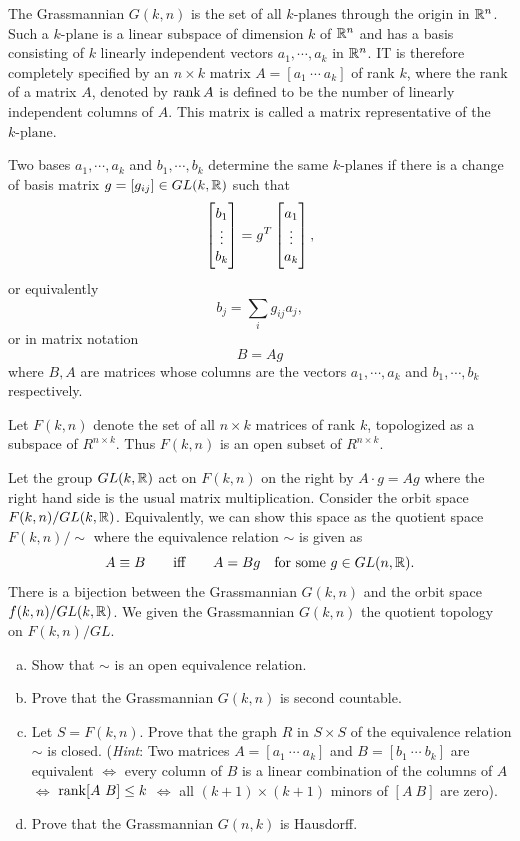 \begin{problem}
	\label{problem:Grassmannian}
	The Grassmannian $ G(k,n) $ is the set of all $ k\text{-planes} $ through the origin in $ \mathbb{R}^n $. Such a $ k\text{-plane} $ is a linear subspace of dimension $ k $ of $ \mathbb{R}^n $ and has a basis consisting of $ k $ linearly independent vectors $ a_1,\cdots,a_k $ in $ \mathbb{R}^n $. IT is therefore completely specified by an $ n\times k $ matrix $ A = [a_1\ \cdots\ a_k] $ of rank $ k $, where the rank of a matrix $ A $, denoted by $ \rank A $ is defined to be the number of linearly independent columns of $ A $. This matrix is called a matrix representative of the $ k\text{-plane} $.
	
	Two bases $ a_1,\cdots,a_k $ and $ b_1,\cdots,b_k $ determine the same $ k\text{-planes} $ if there is a change of basis matrix $ g = [g_{ij}] \in GL(k,\mathbb{R}) $ such that 
	\[ \begin{bmatrix} b_1 \\ \vdots \\ b_k \end{bmatrix} = g^T \begin{bmatrix} a_1 \\ \vdots \\ a_k \end{bmatrix}, \]
	or equivalently
	\[ b_j = \sum_{i}g_{ij}a_j, \]
	or in matrix notation
	\[ B = Ag \]
	where $ B,A $ are matrices whose columns are the vectors $ a_1,\cdots,a_k $ and $ b_1,\cdots,b_k $ respectively.
	
	Let $ F(k,n) $ denote the set of all $ n\times k $ matrices of rank $ k $, topologized as a subspace of $ R^{n\times k} $. Thus $ F(k,n) $ is an open subset of $ R^{n\times k} $.
	
	Let the group $ GL(k,\mathbb{R}) $ act on $ F(k,n) $ on the right by $ A\cdot g = Ag $ where the right hand side is the usual matrix multiplication. Consider the orbit space $ F(k,n)/GL(k,\mathbb{R}) $. Equivalently, we can show this space as the quotient space $ F(k,n)/\sim $ where the equivalence relation $ \sim $ is given as
	\[ A \equiv B \qquad \text{iff} \qquad A = Bg \quad \text{for some $ g \in GL(n,\mathbb{R}) $}. \]
	There is a bijection between the Grassmannian $ G(k,n) $  and the orbit space $ f(k,n)/GL(k,\mathbb{R}) $. We given the Grassmannian $ G(k,n) $ the quotient topology on $ F(k,n)/GL $.
	\begin{enumerate}[(a)]
		\item Show that $ \sim $ is an open equivalence relation.
		\item Prove that the Grassmannian $ G(k,n) $ is second countable.
		\item Let $ S = F(k,n) $. Prove that the graph $ R $ in $ S\times S $ of the equivalence relation $ \sim $ is closed. (\emph{Hint}: Two matrices $ A = [a_1\ \cdots\ a_k]$ and $ B = [b_1\ \cdots\ b_k] $ are equivalent $ \Leftrightarrow $ every column of $ B $ is a linear combination of the columns of $ A $ $ \Leftrightarrow $ $ \rank[A\ B] \leq k $ $ \Leftrightarrow $ all $ (k+1)\times(k+1) $ minors of $ [A\ B] $ are zero).
		\item Prove that the Grassmannian $ G(n,k) $ is Hausdorff.
		

\end{enumerate}
\end{problem}
